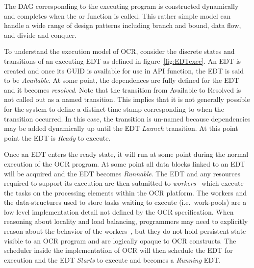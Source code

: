 The DAG corresponding
to the executing program is constructed dynamically and completes when the
 or  function is called.
This rather simple model can handle a wide range of
design patterns including branch and bound, data flow, and divide and
conquer.
%
%

To understand the execution model of OCR, consider the discrete states and
transitions of an executing EDT as defined in figure~\ref{fig:EDTexec}.  An
EDT is created and once its GUID is available for use in API function, the EDT is said
to be \emph{Available}.  At some point, the dependences
are fully defined for the EDT and it becomes \emph{resolved}.
Note that the transition from Available to Resolved is not called out as a named transition.
This implies that it is not generally possible for the system to define a distinct time-stamp
corresponding to when the transition occurred.  In this case, the transition is un-named
because dependencies may be added dynamically up until the
EDT \emph{Launch} transition.  At this point point the
EDT is \emph{Ready} to execute.

Once an EDT enters the ready state,  it will run at some point during the normal execution
of the OCR program.   At some point all data blocks linked to an EDT will be acquired and the
EDT becomes \emph{Runnable}. The
EDT  and any resources required
to support its execution are then submitted to
\emph{workers}~\cite{GBRS09} which execute the tasks on
the processing elements within the OCR platform. The workers and the
data-structures used to store tasks waiting to execute
(i.e.\ work-pools) are a low level implementation detail not defined by
the OCR specification. When reasoning about locality and load
balancing, programmers may need to explicitly reason about the
behavior of the workers~\cite{Chatterjee13}, but they do not hold
persistent state visible to an OCR program and are logically opaque to
OCR constructs. The scheduler inside the implementation of OCR
will then schedule the EDT for execution and the EDT  \emph{Starts} to execute and
becomes a \emph{Running} EDT.


